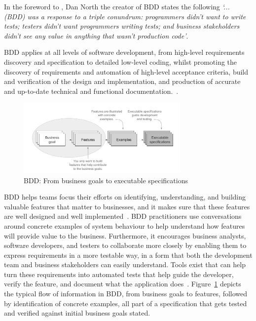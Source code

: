 \documentclass[dissertation,final]{softeng}
\begin{document}
In the foreword to , Dan North the creator of BDD states the following \emph{`... (BDD) was a response to a triple conundrum: programmers didn't want to write tests; testers didn't want programmers writing tests; and business stakeholders didn't see any value in anything that wasn't production code'}.

BDD applies at all levels of software development, from high-level requirements discovery and specification to detailed low-level coding, whilst promoting the discovery of requirements and automation of high-level acceptance criteria, build and verification of the design and implementation, and production of accurate and up-to-date technical and functional documentation.~\citep{Smart201410}.

\begin{figure}[h]
\includegraphics[width=0.75\textwidth]{BDD}
\centering
\caption[From business goals to executable specifications]{BDD: From business goals to executable specifications~\citep{Smart201410}}
\label{fig:bdd_from_goals_to_specs}
\end{figure}

BDD helps teams focus their efforts on identifying, understanding, and building valuable features that matter to businesses, and it makes sure that these features are well designed and well implemented~\citep{Smart201410}. BDD practitioners use conversations around concrete examples of system behaviour to help understand how features will provide value to the business. Furthermore, it encourages business analysts, software developers, and testers to collaborate more closely by enabling them to express requirements in a more testable way, in a form that both the development team and business stakeholders can easily understand. Tools exist that can help turn these requirements into automated tests that help guide the developer, verify the feature, and document what the application does~\citep{Smart201410,wynne2012cucumber}. Figure~\ref{fig:bdd_from_goals_to_specs} depicts the typical flow of information in BDD, from business goals to features, followed by identification of concrete examples, all part of a specification that gets tested and verified against initial business goals stated.
\end{document}
